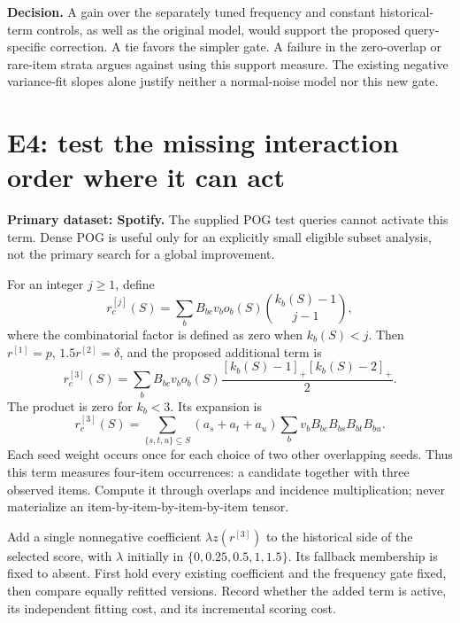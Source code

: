 \documentclass[11pt,a4paper]{article}
\begin{document}
\textbf{Decision.} A gain over the separately tuned frequency and constant
historical-term controls, as well as the original model,
would support the proposed query-specific correction. A tie favors the
simpler gate. A failure in the zero-overlap or rare-item strata argues against
using this support measure. The existing negative variance-fit slopes alone
justify neither a normal-noise model nor this new gate.

\section{E4: test the missing interaction order where it can act}
\label{sec:e4}

\textbf{Primary dataset: Spotify.} The supplied POG test queries cannot
activate this term. Dense POG is useful only for an explicitly small eligible
subset analysis, not the primary search for a global improvement.

For an integer $j\geq1$, define
\begin{equation}
 r^{[j]}_c(S)=\sum_b B_{bc}v_bo_b(S)
                         \binom{k_b(S)-1}{j-1},
 \label{eq:orders}
\end{equation}
where the combinatorial factor is defined as zero when $k_b(S)<j$.
Then $r^{[1]}=p$, $1.5r^{[2]}=\delta$, and the proposed additional term is
\begin{equation}
 r^{[3]}_c(S)=\sum_bB_{bc}v_bo_b(S)
                 \frac{[k_b(S)-1]_+[k_b(S)-2]_+}{2}.
 \label{eq:third}
\end{equation}
The product is zero for $k_b<3$. Its expansion is
\begin{equation}
 r^{[3]}_c(S)=\sum_{\{s,t,u\}\subseteq S}(a_s+a_t+a_u)
                   \sum_bv_bB_{bc}B_{bs}B_{bt}B_{bu}.
\end{equation}
Each seed weight occurs once for each choice of two other overlapping
seeds. Thus this term measures four-item occurrences: a candidate together
with three observed items. Compute it through overlaps and incidence
multiplication; never materialize an item-by-item-by-item-by-item tensor.

Add a single nonnegative coefficient $\lambda z(r^{[3]})$ to the
historical side of the selected score, with $\lambda$ initially in
$\{0,0.25,0.5,1,1.5\}$. Its fallback membership is fixed to absent.
First hold every existing coefficient and the frequency gate fixed, then
compare equally refitted versions. Record whether the added term is active,
its independent fitting cost, and its incremental scoring cost.
\end{document}
